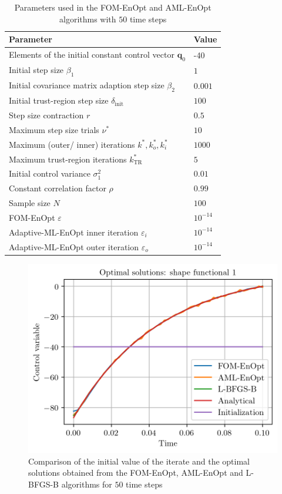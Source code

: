 \begin{table}
\caption{\label{FOMAMLEnOptParametersNT50}Parameters used in the FOM-EnOpt and AML-EnOpt algorithms with $50$ time steps}
\centering
\begin{tabular}{ll}
\hline
Parameter & Value\\
\hline
Elements of the initial constant control vector $\mathbf{q}_0$ & -40\\
Initial step size $\beta_1$ & $1$\\
Initial covariance matrix adaption step size $\beta_2$ & $0.001$\\
Initial trust-region step size $\delta_\mathrm{init}$ & $100$\\
Step size contraction $r$ & $0.5$\\
Maximum step size trials $\nu^*$ & $10$\\
Maximum (outer/ inner) iterations $k^*, k^*_o, k^*_i$ & $1000$\\
Maximum trust-region iterations $k^*_\mathrm{TR}$ & $5$\\
Initial control variance $\sigma^2_1$ & $0.01$\\
Constant correlation factor $\rho$ & $0.99$\\
Sample size $N$ & $100$\\
FOM-EnOpt $\varepsilon$ & $10^{-14}$\\
Adaptive-ML-EnOpt inner iteration $\varepsilon_i$ & $10^{-14}$\\
Adaptive-ML-EnOpt outer iteration $\varepsilon_o$ & $10^{-14}$\\
\hline
\end{tabular}
\end{table}

\begin{figure}
\centering
\includegraphics{Plots/solutionsNT50.png}
\caption{\label{solutionsNT50Plot}Comparison of the initial value of the iterate and the optimal solutions obtained from the FOM-EnOpt, AML-EnOpt and L-BFGS-B algorithms for $50$ time steps}
\end{figure}


